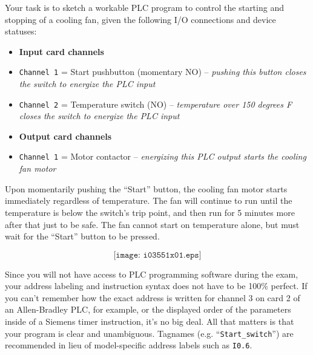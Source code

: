 

Your task is to sketch a workable PLC program to control the starting and stopping of a cooling fan, given the following I/O connections and device statuses:

\begin{itemize}
\item{} {\bf Input card channels} 
\item{} {\tt Channel 1} = Start pushbutton (momentary NO) -- {\it pushing this button closes the switch to energize the PLC input}
\item{} {\tt Channel 2} = Temperature switch (NO) -- {\it temperature over 150 degrees F closes the switch to energize the PLC input}
\end{itemize}

\begin{itemize}
\item{} {\bf Output card channels} 
\item{} {\tt Channel 1} = Motor contactor -- {\it energizing this PLC output starts the cooling fan motor}
\end{itemize}

\vskip 10pt

Upon momentarily pushing the ``Start'' button, the cooling fan motor starts immediately regardless of temperature.  The fan will continue to run until the temperature is below the switch's trip point, and then run for 5 minutes more after that just to be safe.  The fan cannot start on temperature alone, but must wait for the ``Start'' button to be pressed.

$$\texttt{[image: i03551x01.eps]}$$

Since you will not have access to PLC programming software during the exam, your address labeling and instruction syntax does not have to be 100\% perfect.  If you can't remember how the exact address is written for channel 3 on card 2 of an Allen-Bradley PLC, for example, or the displayed order of the parameters inside of a Siemens timer instruction, it's no big deal.  All that matters is that your program is clear and unambiguous.  Tagnames (e.g. ``{\tt Start\_switch}'') are recommended in lieu of model-specific address labels such as {\tt I0.6}.






